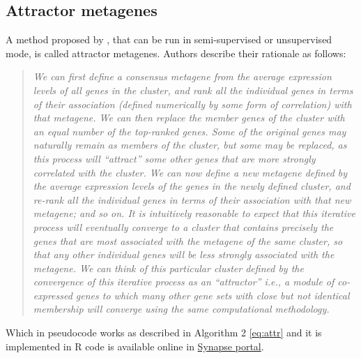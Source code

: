 \documentclass[12pt,]{book}
\theoremstyle{definition}
\theoremstyle{definition}
\theoremstyle{definition}
\theoremstyle{remark}
\begin{document}
\hypertarget{attractor-metagenes}{%
\subsection{Attractor metagenes}\label{attractor-metagenes}}

A method proposed by \citet{Cheng2013}, that can be run in
semi-supervised or unsupervised mode, is called attractor metagenes.
Authors describe their rationale as follows:

\begin{quote}
\emph{We can first define a consensus metagene from the average
expression levels of all genes in the cluster, and rank all the
individual genes in terms of their association (defined numerically by
some form of correlation) with that metagene. We can then replace the
member genes of the cluster with an equal number of the top-ranked
genes. Some of the original genes may naturally remain as members of the
cluster, but some may be replaced, as this process will ``attract'' some
other genes that are more strongly correlated with the cluster. We can
now define a new metagene defined by the average expression levels of
the genes in the newly defined cluster, and re-rank all the individual
genes in terms of their association with that new metagene; and so on.
It is intuitively reasonable to expect that this iterative process will
eventually converge to a cluster that contains precisely the genes that
are most associated with the metagene of the same cluster, so that any
other individual genes will be less strongly associated with the
metagene. We can think of this particular cluster defined by the
convergence of this iterative process as an ``attractor'' i.e., a module
of co-expressed genes to which many other gene sets with close but not
identical membership will converge using the same computational
methodology.}
\end{quote}

Which in pseudocode works as described in Algorithm 2 \eqref{eq:attr} and
it is implemented in R code is available online in
\href{https://www.synapse.org/\#!Synapse:syn1446295}{Synapse portal}.
\end{document}
